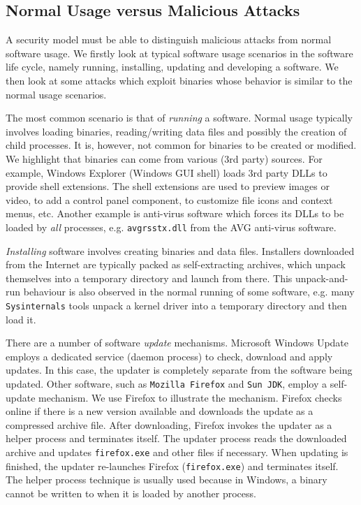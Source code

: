 \subsection{Normal Usage versus Malicious Attacks}
\label{sec:binint-usageattack}

A security model must be able to distinguish
malicious attacks from normal software usage.
We firstly look at typical software usage scenarios in the
software life cycle, namely running, installing, updating and developing 
a software.
We then look at some attacks which exploit binaries whose
behavior is similar to the normal usage scenarios.

The most common scenario is that of {\em running} a software.
Normal usage typically involves loading binaries,
reading/writing data files and possibly the creation of child processes.
It is, however, not common for binaries to be created or modified.
We highlight that binaries can come from
various (3rd party) sources.
For example, Windows Explorer (Windows GUI shell) loads 3rd party DLLs
to provide shell extensions.
The shell extensions are used to preview
images or video, to add a control panel component, to customize
file icons and context menus, etc.
Another example is anti-virus software which forces
its DLLs to be loaded by {\em all} processes, e.g. {\tt avgrsstx.dll}
from the AVG anti-virus software.

{\em Installing} software involves creating binaries
and data files.
Installers downloaded from the Internet are typically packed as
self-extracting archives, which
unpack themselves into a temporary directory and launch from there.
This unpack-and-run behaviour is also observed in the normal
running of some software, e.g.
many {\tt Sysinternals} tools
unpack a kernel driver into a temporary directory and then load it.

There are a number of software {\em update} mechanisms.
Microsoft Windows Update employs a dedicated service (daemon process) to check,
download and apply updates.
In this case, the updater is completely separate from 
the software being updated.
Other software, such as {\tt Mozilla Firefox} and {\tt Sun JDK},
employ a self-update mechanism.
We use Firefox to illustrate the mechanism.
Firefox checks online if there is a new version available and
downloads the update as a compressed archive file.
After downloading, Firefox invokes the updater
as a helper process and terminates itself.
The updater process reads the downloaded archive and 
updates {\tt firefox.exe}
and other files if necessary.
When updating is finished, the updater re-launches Firefox ({\tt firefox.exe})
and terminates itself.
The helper process technique is usually used
because in Windows, a binary cannot be written to when it is loaded by
another process.

